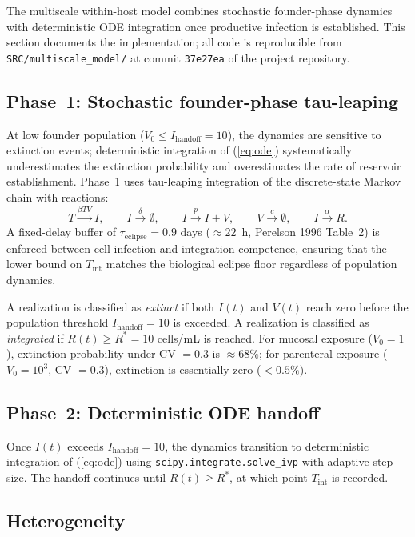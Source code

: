 \documentclass[11pt]{article}
\theoremstyle{definition}
\theoremstyle{remark}
\newcommand{\Tint}{T_{\text{int}}}
\begin{document}
The multiscale within-host model combines stochastic founder-phase dynamics with deterministic ODE integration once productive infection is established. This section documents the implementation; all code is reproducible from \texttt{SRC/multiscale\_model/} at commit \texttt{37e27ea} of the project repository.

\subsection{Phase~1: Stochastic founder-phase tau-leaping}

At low founder population ($V_{0} \leq I_{\text{handoff}} = 10$), the dynamics are sensitive to extinction events; deterministic integration of (\ref{eq:ode}) systematically underestimates the extinction probability and overestimates the rate of reservoir establishment. Phase~1 uses tau-leaping integration of the discrete-state Markov chain with reactions:
\[
T \xrightarrow{\beta T V} I, \qquad I \xrightarrow{\delta} \emptyset, \qquad I \xrightarrow{p} I + V, \qquad V \xrightarrow{c} \emptyset, \qquad I \xrightarrow{\alpha} R.
\]
A fixed-delay buffer of $\tau_{\text{eclipse}} = 0.9$ days ($\approx 22$~h, Perelson 1996 Table~2)\cite{perelson1996_si} is enforced between cell infection and integration competence, ensuring that the lower bound on $\Tint$ matches the biological eclipse floor regardless of population dynamics.

A realization is classified as \emph{extinct} if both $I(t)$ and $V(t)$ reach zero before the population threshold $I_{\text{handoff}} = 10$ is exceeded. A realization is classified as \emph{integrated} if $R(t) \geq R^{*} = 10$ cells/mL is reached. For mucosal exposure ($V_{0} = 1$), extinction probability under CV $= 0.3$ is $\approx 68\%$; for parenteral exposure ($V_{0} = 10^{3}$, CV $= 0.3$), extinction is essentially zero ($<0.5\%$).

\subsection{Phase~2: Deterministic ODE handoff}

Once $I(t)$ exceeds $I_{\text{handoff}} = 10$, the dynamics transition to deterministic integration of (\ref{eq:ode}) using \texttt{scipy.integrate.solve\_ivp} with adaptive step size. The handoff continues until $R(t) \geq R^{*}$, at which point $\Tint$ is recorded.

\subsection{Heterogeneity}
\end{document}
